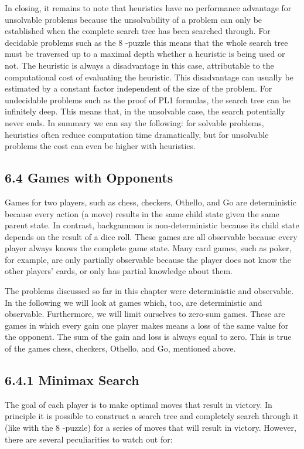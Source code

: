 \documentclass[10pt]{article}
\begin{document}
In closing, it remains to note that heuristics have no performance advantage for unsolvable problems because the unsolvability of a problem can only be established when the complete search tree has been searched through. For decidable problems such as the 8 -puzzle this means that the whole search tree must be traversed up to a maximal depth whether a heuristic is being used or not. The heuristic is always a disadvantage in this case, attributable to the computational cost of evaluating the heuristic. This disadvantage can usually be estimated by a constant factor independent of the size of the problem. For undecidable problems such as the proof of PL1 formulas, the search tree can be infinitely deep. This means that, in the unsolvable case, the search potentially never ends. In summary we can say the following: for solvable problems, heuristics often reduce computation time dramatically, but for unsolvable problems the cost can even be higher with heuristics.

\subsection*{6.4 Games with Opponents}
Games for two players, such as chess, checkers, Othello, and Go are deterministic because every action (a move) results in the same child state given the same parent state. In contrast, backgammon is non-deterministic because its child state depends on the result of a dice roll. These games are all observable because every player always knows the complete game state. Many card games, such as poker, for example, are only partially observable because the player does not know the other players' cards, or only has partial knowledge about them.

The problems discussed so far in this chapter were deterministic and observable. In the following we will look at games which, too, are deterministic and observable. Furthermore, we will limit ourselves to zero-sum games. These are games in which every gain one player makes means a loss of the same value for the opponent. The sum of the gain and loss is always equal to zero. This is true of the games chess, checkers, Othello, and Go, mentioned above.

\subsection*{6.4.1 Minimax Search}
The goal of each player is to make optimal moves that result in victory. In principle it is possible to construct a search tree and completely search through it (like with the 8 -puzzle) for a series of moves that will result in victory. However, there are several peculiarities to watch out for:
\end{document}
